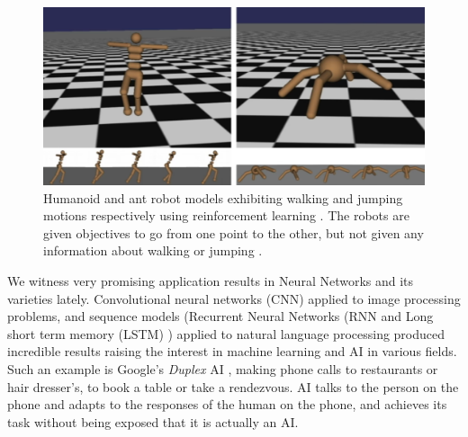 \begin{figure}
\begin{center}
\includegraphics[width=13.3cm]{figures/deepmindWalking}
\caption{Humanoid and ant robot models \cite{deepmindHumonoidWalkingStanford} exhibiting walking and jumping motions respectively using reinforcement learning \cite{deepmindWebsiteHumonoidWalking}. The robots are given objectives to go from one point to the other, but not given any information about walking or jumping \cite{deepmindHumonoidWalkingVideo}.} 
\label{fig:deepmindWalking}
\end{center}
\end{figure}

We witness very promising application results in Neural Networks and its varieties lately. Convolutional neural networks (CNN) applied to image processing problems, and sequence models (Recurrent Neural Networks (RNN and Long short term memory (LSTM) ) applied to natural language processing produced incredible results raising the interest in machine learning and AI in various fields. Such an example is Google's \emph{Duplex} AI \cite{googleDuplex}, making phone calls to restaurants or hair dresser's, to book a table or take a rendezvous.  AI talks to the person on the phone and adapts to the responses of the human on the phone, and achieves its task without being exposed that it is actually an AI.



